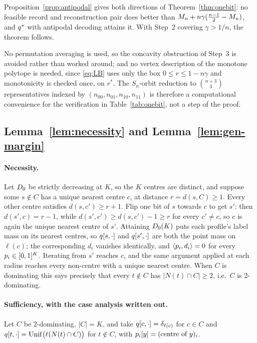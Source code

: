 Proposition~\ref{prop:antipodal} gives both directions of
Theorem~\ref{thm:onebit}: no feasible record and reconstruction pair does better
than $M_n + n\gamma(\frac{n-1}{2}-M_n)$, and $q^\ast$ with antipodal decoding
attains it. With Step~2 covering $\gamma > 1/n$, the theorem follows.

\begin{remark}
\label{rem:notneeded}
No permutation averaging is used, so the concavity obstruction of Step~3 is
avoided rather than worked around; and no vertex description of the monotone
polytope is needed, since \eqref{eq:LB} uses only the box
$0 \le r \le 1-n\gamma$ and monotonicity is checked once, on $r^\ast$. The
$S_n$-orbit reduction to $\binom{n+3}{3}$ representatives indexed by
$(n_{00},n_{01},n_{10},n_{11})$ is therefore a computational convenience for the
verification in Table~\ref{tab:onebit}, not a step of the proof.
\end{remark}

\subsection{Lemma~\ref{lem:necessity} and Lemma~\ref{lem:gen-margin}}
\label{app:threshold}

\paragraph{Necessity.}
Let $D_0$ be strictly decreasing at $K$, so the $K$ centres are distinct, and
suppose some $s \notin C$ has a unique nearest centre $c$, at distance
$r = d(s,C) \ge 1$. Every other centre satisfies $d(s,c') \ge r+1$. Flip one bit
of $s$ towards $c$ to get $s'$: then $d(s',c) = r-1$, while
$d(s',c') \ge d(s,c') - 1 \ge r$ for every $c' \ne c$, so $c$ is again the unique
nearest centre of $s'$. Attaining $D_0(K)$ puts each profile's label mass on
its nearest centres, so $q[s,\cdot]$ and $q[s',\cdot]$ are both the point
mass on $\ell(c)$; the corresponding $d_i$ vanishes identically, and
$\langle p_i, d_i \rangle = 0$ for every $p_i \in [0,1]^K$. Iterating from
$s'$ reaches $c$, and the same argument applied at each radius reaches every
non-centre with a unique nearest centre. When $C$ is dominating this says
precisely that every $t \notin C$ has $|N(t) \cap C| \ge 2$, i.e.\ $C$ is
2-dominating.

\paragraph{Sufficiency, with the case analysis written out.}
Let $C$ be 2-dominating, $|C| = K$, and take
$q[c,\cdot] = \delta_{\ell(c)}$ for $c \in C$ and
$q[t,\cdot] = \mathrm{Unif}\bigl(\ell(N(t)\cap C)\bigr)$ for $t \notin C$,
with $p_i[y] = (\text{centre of } y)_i$.

